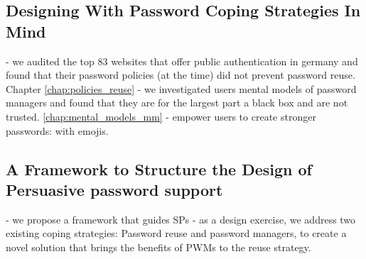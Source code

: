 \subsection{Designing With Password Coping Strategies In Mind}
- we audited the top 83 websites that offer public authentication in germany and found that their password policies (at the time) did not prevent password reuse. Chapter \ref{chap:policies_reuse}
- we investigated users mental models of password managers and found that they are for the largest part a black box and are not trusted. \ref{chap:mental_models_mm}
- empower users to create stronger passwords: with emojis. 


\subsection{A Framework to Structure the Design of Persuasive password support}
- we propose a framework that guides \glspl{SP} 
- as a design exercise, we address two existing coping strategies: Password reuse and password managers, to create a novel solution that brings the benefits of PWMs to the reuse strategy. 

%	
%	
